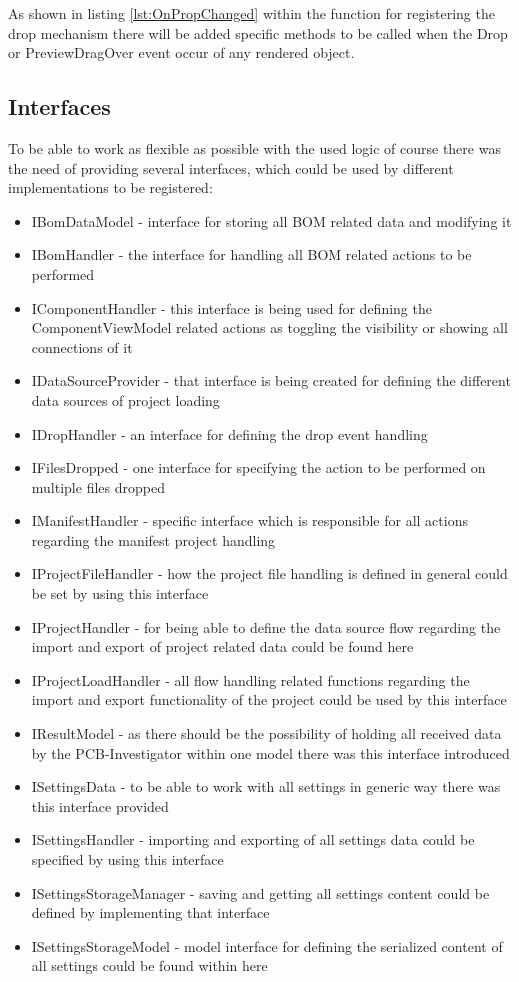 As shown in listing \ref{lst:OnPropChanged} within the function for registering the drop mechanism there will be added specific methods to be called when the Drop or PreviewDragOver event occur of any rendered object.

		\subsection{Interfaces}
To be able to work as flexible as possible with the used logic of course there was the need of providing several interfaces, which could be used by different implementations to be registered:
\begin{itemize}
	\item IBomDataModel - interface for storing all \ac{BOM} related data and modifying it
	\item IBomHandler - the interface for handling all \ac{BOM} related actions to be performed
	\item IComponentHandler - this interface is being used for defining the ComponentViewModel related actions as toggling the visibility or showing all connections of it
	\item IDataSourceProvider - that interface is being created for defining the different data sources of project loading
	\item IDropHandler - an interface for defining the drop event handling
	\item IFilesDropped - one interface for specifying the action to be performed on multiple files dropped
	\item IManifestHandler - specific interface which is responsible for all actions regarding the manifest project handling
	\item IProjectFileHandler - how the project file handling is defined in general could be set by using this interface
	\item IProjectHandler - for being able to define the data source flow regarding the import and export of project related data could be found here
	\item IProjectLoadHandler - all flow handling related functions regarding the import and export functionality of the project could be used by this interface
	\item IResultModel - as there should be the possibility of holding all received data by the \ac{PCB}-Investigator within one model there was this interface introduced
	\item ISettingsData - to be able to work with all settings in generic way there was this interface provided
	\item ISettingsHandler - importing and exporting of all settings data could be specified by using this interface
	\item ISettingsStorageManager - saving and getting all settings content could be defined by implementing that interface
	\item ISettingsStorageModel - model interface for defining the serialized content of all settings could be found within here
\end{itemize}

